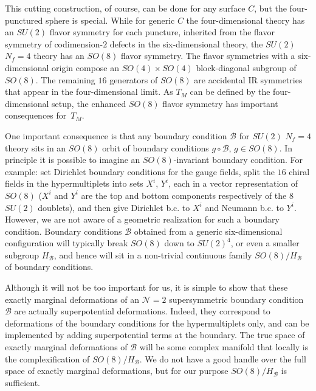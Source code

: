\documentclass[11pt,letterpaper]{article}
\numberwithin{equation}{section}
\newcommand{\CB}{\mathcal{B}}
\newcommand{\CN}{\mathcal{N}}
\begin{document}
This cutting construction, of course, can be done for any surface $C$, but the four-punctured sphere is special. While for generic $C$
the four-dimensional theory has an $SU(2)$ flavor symmetry for each puncture, inherited from the flavor symmetry of codimension-$2$ defects in the six-dimensional theory, the $SU(2)$ $N_f=4$ theory has an $SO(8)$ flavor symmetry.
The flavor symmetries with a six-dimensional origin compose an $SO(4) \times SO(4)$ block-diagonal subgroup of $SO(8)$.
The remaining $16$ generators of $SO(8)$ are accidental IR symmetries that appear in the four-dimensional limit.
As $T_M$ can be defined by the four-dimensional setup, the enhanced $SO(8)$ flavor symmetry has important consequences for~$T_M$.

One important consequence is that any boundary condition $\CB$ for $SU(2)$ $N_f=4$ theory
sits in an $SO(8)$ orbit of boundary conditions $g\circ \CB$, $g \in SO(8)$.
In principle it is possible to imagine an $SO(8)$-invariant boundary condition. For example:
set Dirichlet boundary conditions for the gauge fields,
split the $16$ chiral fields in the hypermultiplets into sets $X^i$, $Y^i$, each in a vector representation of $SO(8)$
($X^i$ and $Y^i$ are the top and bottom components respectively of the $8$  $SU(2)$ doublets),
and then give Dirichlet b.c. to $X^i$ and Neumann b.c. to $Y^i$. However, we are not aware of a geometric realization for such a boundary condition.
Boundary conditions $\CB$ obtained from a generic six-dimensional configuration will typically break $SO(8)$ down to $SU(2)^4$,
or even a smaller subgroup $H_\CB$, and hence will sit in a non-trivial continuous family $SO(8)/H_{\CB}$ of boundary conditions.

Although it will not be too important for us, it is simple to show that these exactly marginal deformations of an $\CN=2$ supersymmetric boundary condition
$\CB$ are actually superpotential deformations. Indeed, they correspond to deformations of the boundary conditions for the hypermultiplets only, and
can be implemented by adding superpotential terms at the boundary. The true space of exactly marginal deformations of $\CB$ will be some complex manifold
that locally is the complexification of  $SO(8)/H_{\CB}$. We do not have a good handle over the full space of exactly marginal deformations,
but for our purpose $SO(8)/H_{\CB}$ is sufficient.
\end{document}

